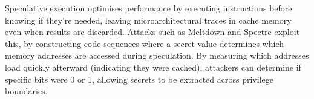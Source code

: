 Speculative execution optimises performance by executing instructions before knowing if they're needed, leaving microarchitectural traces in cache memory even when results are discarded. Attacks such as Meltdown and Spectre exploit this, by constructing code sequences where a secret value determines which memory addresses are accessed during speculation. By measuring which addresses load quickly afterward (indicating they were cached), attackers can determine if specific bits were 0 or 1, allowing secrets to be extracted across privilege boundaries.
